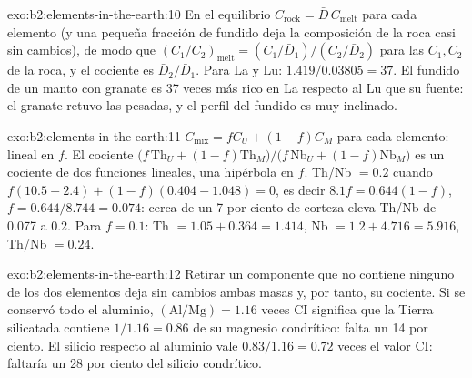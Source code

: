 \begin{solution}{exo:b2:elements-in-the-earth:10}
En el equilibrio $C_{\mathrm{rock}} = \bar D\,C_{\mathrm{melt}}$ para cada elemento (y una
pequeña fracción de fundido deja la composición de la roca casi sin cambios), de modo que
$(C_1/C_2)_{\mathrm{melt}} = (C_{1}/\bar D_1)/(C_{2}/\bar D_2)$ para las $C_1,
C_2$ de la roca, y el cociente es $\bar D_2/\bar D_1$. Para La y Lu: $1.419/0.03805 = 37$. El fundido
de un manto con granate es 37 veces más rico en La respecto al Lu que su fuente: el granate
retuvo las  pesadas, y el perfil del fundido es muy inclinado.
\end{solution}

\begin{solution}{exo:b2:elements-in-the-earth:11}
$C_{\mathrm{mix}} = fC_U + (1-f)C_M$ para cada elemento: lineal en $f$. El cociente
$\bigl(f\,\mathrm{Th}_U + (1-f)\mathrm{Th}_M\bigr)/\bigl(f\,\mathrm{Nb}_U +
(1-f)\mathrm{Nb}_M\bigr)$ es un cociente de dos funciones lineales, una hipérbola en $f$.
Th/Nb $= 0.2$ cuando $f(10.5-2.4) + (1-f)(0.404-1.048) = 0$, es decir $8.1f = 0.644(1-f)$,
$f = 0.644/8.744 = 0.074$: cerca de un 7 por ciento de corteza eleva Th/Nb de 0.077 a 0.2. Para
$f = 0.1$: Th $= 1.05 + 0.364 = 1.414$, Nb $= 1.2 + 4.716 = 5.916$, Th/Nb $= 0.24$.
\end{solution}

\begin{solution}{exo:b2:elements-in-the-earth:12}
Retirar un componente que no contiene ninguno de los dos elementos deja sin cambios ambas masas y, por tanto, su
cociente. Si se conservó todo el aluminio, $(\mathrm{Al}/\mathrm{Mg}) = 1.16$ veces CI
significa que la Tierra silicatada contiene $1/1.16 = 0.86$ de su magnesio condrítico: falta un 14 por
ciento. El silicio respecto al aluminio vale $0.83/1.16 = 0.72$ veces el valor CI:
faltaría un 28 por ciento del silicio condrítico.
\end{solution}

